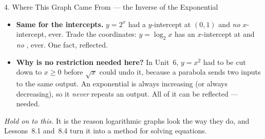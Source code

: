 \documentclass[10pt]{article}
\begin{document}
\begin{notesbox}{4. Where This Graph Came From --- the Inverse of the Exponential}
\begin{itemize}[leftmargin=1.5em, itemsep=3pt]
        logarithm's \emph{vertical} asymptote. It is the same boundary, seen sideways.
  \item \textbf{Same for the intercepts.} $y=2^x$ had a $y$-intercept at $(0,1)$ and \emph{no}
        $x$-intercept, ever. Trade the coordinates: $y=\log_2 x$ has an $x$-intercept at
         and \emph{no} , ever. One fact, reflected.
  \item \textbf{Why is no restriction needed here?} In Unit~6, $y=x^2$ had to be cut down to $x\ge0$
        before $\sqrt{x}$ could undo it, because a parabola sends two inputs to the same output. An
        exponential is always increasing (or always decreasing), so it \emph{never} repeats an
        output. All of it can be reflected ---  needed.
\end{itemize}
\emph{Hold on to this.} It is the reason logarithmic graphs look the way they do, and Lessons~8.1
and~8.4 turn it into a method for solving equations.
\end{notesbox}
\end{document}
